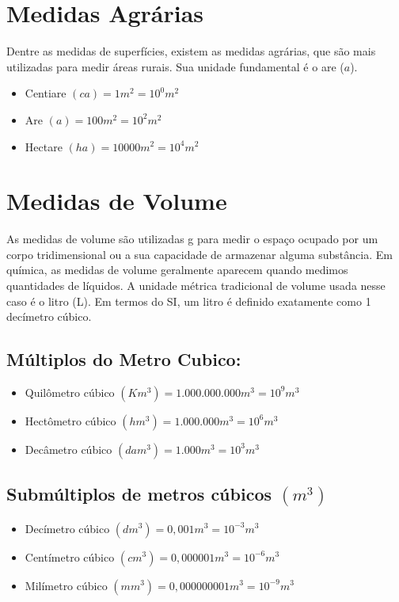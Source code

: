 \documentclass[11pt,fleqn]{book}
\begin{document}
\section{Medidas Agrárias}
Dentre as medidas de superfícies, existem as medidas
agrárias, que são mais utilizadas para medir áreas rurais. Sua
unidade fundamental é o are ($a$).
	\begin{itemize}
		\item Centiare $(ca) = 1m^2=10^0m^2$
		\item Are $(a)= 100m^2 = 10^2m^2$
		\item Hectare $(ha) = 10000m^2 = 10^4m^2$
	\end{itemize}

\section{Medidas de Volume} 
As medidas de volume são utilizadas g
para medir o espaço ocupado por um
corpo tridimensional ou a sua
capacidade de armazenar alguma
substância. Em química, as medidas de
volume geralmente aparecem quando
medimos quantidades de líquidos. A
unidade métrica tradicional de volume
usada nesse caso é o litro (L). Em termos
do SI, um litro é definido exatamente
como 1 decímetro cúbico. 
	\subsection{Múltiplos do Metro Cubico:}
		\begin{itemize}
		    \item Quilômetro cúbico $(Km^3) = 1.000.000.000 m^3 = 10^9 m^3$
		    \item Hectômetro cúbico $(hm^3) = 1.000.000 m^3 = 10^6 m^3$
		    \item Decâmetro cúbico $(dam^3) = 1.000 m^3 = 10^3 m^3$
		\end{itemize}
	
	\subsection{Submúltiplos de metros cúbicos $(m^3)$}
		\begin{itemize}
		    \item Decímetro cúbico $(dm^3) = 0,001 m^3 = 10^{-3} m^3$
		    \item Centímetro cúbico $(cm^3) = 0,000001 m^3 = 10^{-6} m^3$
		    \item Milímetro cúbico $(mm^3) = 0,000000001 m^3 = 10^{-9} m^3$
		\end{itemize}
	
\end{document}
